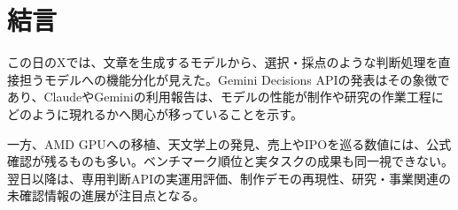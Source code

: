 \section{結言}
この日のXでは、文章を生成するモデルから、選択・採点のような判断処理を直接担うモデルへの機能分化が見えた。Gemini Decisions APIの発表はその象徴であり、ClaudeやGeminiの利用報告は、モデルの性能が制作や研究の作業工程にどのように現れるかへ関心が移っていることを示す。

一方、AMD GPUへの移植、天文学上の発見、売上やIPOを巡る数値には、公式確認が残るものも多い。ベンチマーク順位と実タスクの成果も同一視できない。翌日以降は、専用判断APIの実運用評価、制作デモの再現性、研究・事業関連の未確認情報の進展が注目点となる。